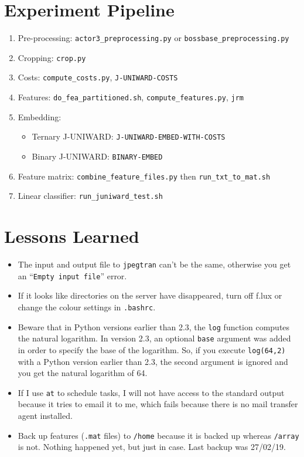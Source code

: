 \documentclass[11pt,a4paper]{report}
\begin{document}
\section{Experiment Pipeline}
\begin{enumerate}
  \item Pre-processing: \texttt{actor3\_preprocessing.py} or \texttt{bossbase\_preprocessing.py}
  \item Cropping: \texttt{crop.py}
  \item Costs: \texttt{compute\_costs.py}, \texttt{J-UNIWARD-COSTS}
  \item Features: \texttt{do\_fea\_partitioned.sh}, \texttt{compute\_features.py}, \texttt{jrm}
  \item Embedding:
    \begin{itemize}
      \item Ternary J-UNIWARD: \texttt{J-UNIWARD-EMBED-WITH-COSTS}
      \item Binary J-UNIWARD: \texttt{BINARY-EMBED}
    \end{itemize}
  \item Feature matrix: \texttt{combine\_feature\_files.py} then \texttt{run\_txt\_to\_mat.sh}
  \item Linear classifier: \texttt{run\_juniward\_test.sh}
\end{enumerate}

\section{Lessons Learned}
\label{sec:lessons-learned}

\begin{itemize}

\item The input and output file to \texttt{jpegtran} can't be the same, otherwise you get an ``\texttt{Empty input file}'' error.

\item If it looks like directories on the server have disappeared, turn off f.lux or change the colour settings in \texttt{.bashrc}.

\item Beware that in Python versions earlier than 2.3, the \texttt{log} function computes the natural logarithm. In version 2.3, an optional \texttt{base} argument was added in order to specify the base of the logarithm. So, if you execute \texttt{log(64,2)} with a Python version earlier than 2.3, the second argument is ignored and you get the natural logarithm of 64.

\item If I use \texttt{at} to schedule tasks, I will not have access to the standard output because it tries to email it to me, which fails because there is no mail transfer agent installed.

\item Back up features (\texttt{.mat} files) to \texttt{/home} because it is backed up whereas \texttt{/array} is not. Nothing happened yet, but just in case. Last backup was 27/02/19.

\end{itemize}
\end{document}
